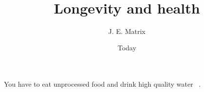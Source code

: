 \documentclass{article}
\begin{document}
\title{Longevity and health}
\author{J. E. Matrix}
\date{Today}
\maketitle

You have to eat unprocessed food and drink high quality water 
~\cite{firstbib}.



\end{document}
